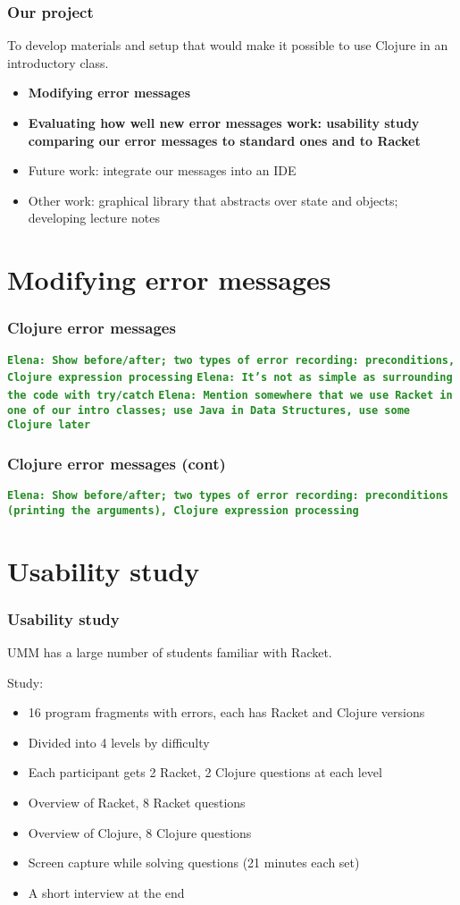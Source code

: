 \documentclass{beamer}
\newcommand{\comment}[1]{{\bf \tt  {#1}}}
\newcommand{\emcomment}[1]{\textcolor{ForestGreen}{\comment{Elena: {#1}}}}
\begin{document}
\begin{frame}
\frametitle{ Our project}
To develop materials and setup that would make it possible to use Clojure in an introductory class. 
\begin{itemize}
\item {\bf Modifying error messages}
\item {\bf Evaluating how well new error messages work: usability study comparing our error messages to standard ones and to Racket}
\item Future work: integrate our messages into an IDE
\item Other work: graphical library that abstracts over state and objects; developing lecture notes 
\end{itemize}
\end{frame}

\section{Modifying error messages}

\begin{frame}
\frametitle{ Clojure error messages}
\emcomment{Show before/after; two types of error recording: preconditions, Clojure expression processing}
\emcomment{It's not as simple as surrounding the code with try/catch}
\emcomment{Mention somewhere that we use Racket in one of our intro classes; use Java in Data Structures, use some Clojure later}
\end{frame}

\begin{frame}
\frametitle{ Clojure error messages (cont)}
\emcomment{Show before/after; two types of error recording: preconditions (printing the arguments), Clojure expression processing}
\end{frame}


\section{Usability study}

\begin{frame}
\frametitle{Usability study}
UMM has a large number of students familiar with Racket. 

Study:
\begin{itemize}
\item 16 program fragments with errors, each has Racket and Clojure versions 
\item Divided into 4 levels by difficulty
\item Each participant gets 2 Racket, 2 Clojure questions at each level
\item Overview of Racket, 8 Racket questions
\item Overview of Clojure, 8 Clojure questions
\item Screen capture while solving questions (21 minutes each set)
\item A short interview at the end
\end{itemize}
\end{frame}
\end{document}
